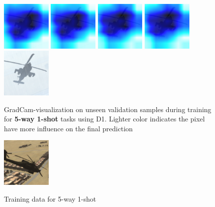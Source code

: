 \begin{figure}[H]
  {\includegraphics[height=2.4cm, width=2.4cm]{images/vbs3/gradcam/5-1/3/Heat_map_of_iterations_0.png}}
  {\includegraphics[height=2.4cm, width=2.4cm]{images/vbs3/gradcam/5-1/3/Heat_map_of_iterations_1.png}}
  {\includegraphics[height=2.4cm, width=2.4cm]{images/vbs3/gradcam/5-1/3/Heat_map_of_iterations_3.png}}
%
  {\includegraphics[height=2.4cm, width=2.4cm]{images/vbs3/gradcam/5-1/3/Heat_map_of_iterations_5.png}}
  {\includegraphics[height=2.4cm, width=2.4cm]{images/vbs3/gradcam/5-1/3/Test_Images.png}}
  
\caption{GradCam-visualization on unseen validation samples during training for \textbf{5-way 1-shot} tasks using D1. Lighter color indicates the pixel have more influence on the final prediction}
\label{grad-cam-5-1}
\end{figure}

\begin{figure}[H]
\centering
\subcaptionbox{}
  {\includegraphics[height=2.4cm, width=2.4cm]{images/vbs3/gradcam/5-1/train/Test_Images.png}}
\label{grad-cam-training}  
\caption{Training data for 5-way 1-shot}
\end{figure}


